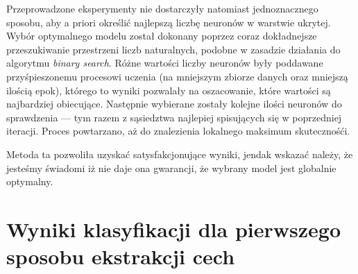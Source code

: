 \documentclass[10pt]{article}
\begin{document}
Przeprowadzone eksperymenty nie dostarczyły natomiast jednoznacznego sposobu, aby a priori określić najlepszą liczbę neuronów w warstwie ukrytej.
Wybór optymalnego modelu został dokonany poprzez coraz dokładnejsze przeszukiwanie przestrzeni liczb naturalnych, podobne w zasadzie działania do algorytmu \emph{binary search}.
Różne wartości liczby neuronów były poddawane przyśpieszonemu procesowi uczenia (na mniejszym zbiorze danych oraz mniejszą ilością epok), którego to wyniki pozwalały na oszacowanie, które wartości są najbardziej obiecujące.
Następnie wybierane zostały kolejne ilości neuronów do sprawdzenia --- tym razem z sąsiedztwa najlepiej spisujących się w poprzedniej iteracji.
Proces powtarzano, aż do znalezienia lokalnego maksimum skutecznośći.

Metoda ta pozwoliła uzyskać satysfakcjonujące wyniki, jendak wskazać należy, że jesteśmy świadomi iż nie daje ona gwarancji, że wybrany model jest globalnie optymalny.

\pagebreak

\section{Wyniki klasyfikacji dla pierwszego sposobu ekstrakcji cech}
\end{document}
